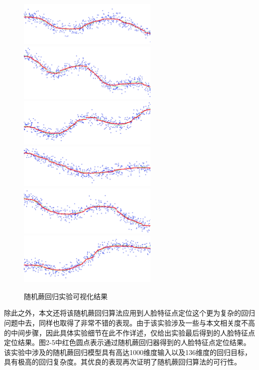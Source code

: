 \begin{figure}[htb]
	\centering 
	\includegraphics[width=0.6\textwidth]{./mypic/随机蕨回归实验1.jpg} 
	\includegraphics[width=0.6\textwidth]{./mypic/随机蕨回归实验2.jpg} 
	\includegraphics[width=0.6\textwidth]{./mypic/随机蕨回归实验3.jpg} 
	\includegraphics[width=0.6\textwidth]{./mypic/随机蕨回归实验4.jpg} 
	\includegraphics[width=0.6\textwidth]{./mypic/随机蕨回归实验5.jpg} 
	\includegraphics[width=0.6\textwidth]{./mypic/随机蕨回归实验6.jpg} 
	\caption{随机蕨回归实验可视化结果} 
\end{figure}

除此之外，本文还将该随机蕨回归算法应用到人脸特征点定位这个更为复杂的回归问题中去，同样也取得了非常不错的表现。由于该实验涉及一些与本文相关度不高的中间步骤，因此具体实验细节在此不作详述，仅给出实验最后得到的人脸特征点定位结果。图2-5中红色圆点表示通过随机蕨回归器得到的人脸特征点定位结果。该实验中涉及的随机蕨回归模型具有高达1000维度输入以及136维度的回归目标，具有极高的回归复杂度。其优良的表现再次证明了随机蕨回归算法的可行性。

